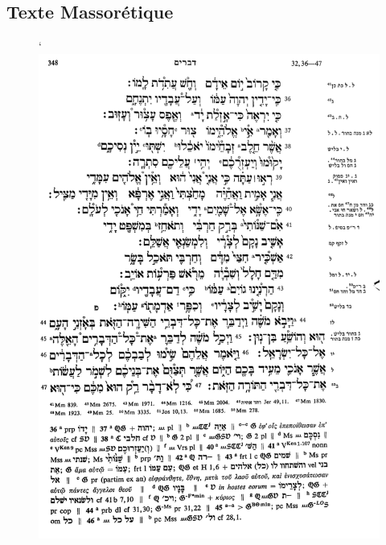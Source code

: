 \documentclass[11pt,a4paper]{article}
\begin{document}
\subsection{Texte Massorétique}
\begin{figure}[!h]
    \begin{minipage}[c]{.46\linewidth}
        \centering`
        \includegraphics[width=1\linewidth]{img/4Q44/BHS_Dt_32_2.png}
    \end{minipage}
    \hfill%
    \begin{minipage}[c]{.46\linewidth}
        \centering

\end{minipage}
\end{figure}
\end{document}
